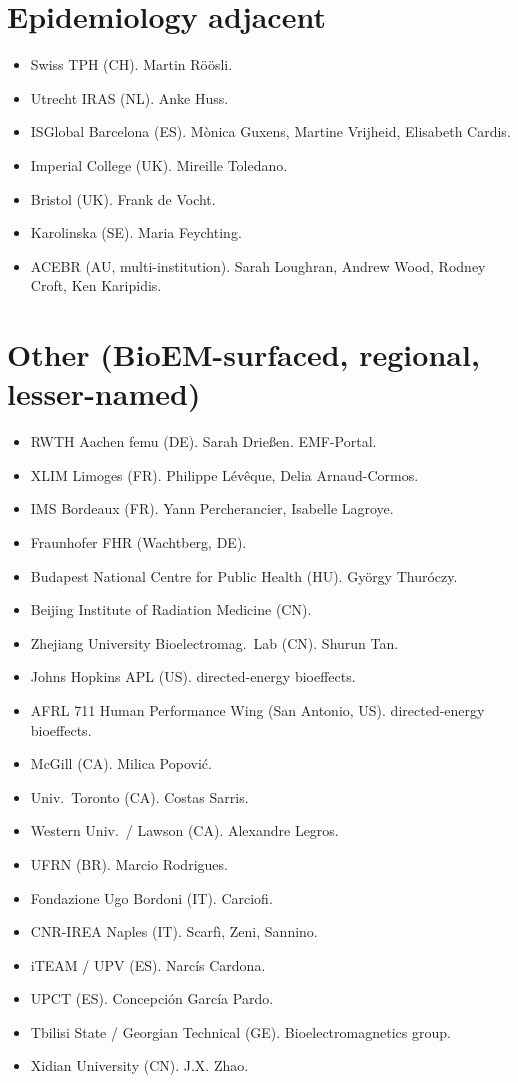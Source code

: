 \documentclass[10pt,a4paper]{article}
\begin{document}
\section{Epidemiology adjacent}
\begin{itemize}
  \item Swiss TPH (CH). Martin R\"o\"osli.
  \item Utrecht IRAS (NL). Anke Huss.
  \item ISGlobal Barcelona (ES). M\`onica Guxens, Martine Vrijheid, Elisabeth Cardis.
  \item Imperial College (UK). Mireille Toledano.
  \item Bristol (UK). Frank de Vocht.
  \item Karolinska (SE). Maria Feychting.
  \item ACEBR (AU, multi-institution). Sarah Loughran, Andrew Wood, Rodney Croft, Ken Karipidis.
\end{itemize}

\section{Other (BioEM-surfaced, regional, lesser-named)}
\begin{itemize}
  \item RWTH Aachen femu (DE). Sarah Drie\ss en. EMF-Portal.
  \item XLIM Limoges (FR). Philippe L\'ev\^eque, Delia Arnaud-Cormos.
  \item IMS Bordeaux (FR). Yann Percherancier, Isabelle Lagroye.
  \item Fraunhofer FHR (Wachtberg, DE).
  \item Budapest National Centre for Public Health (HU). Gy\"orgy Thur\'oczy.
  \item Beijing Institute of Radiation Medicine (CN).
  \item Zhejiang University Bioelectromag.\ Lab (CN). Shurun Tan.
  \item Johns Hopkins APL (US). directed-energy bioeffects.
  \item AFRL 711 Human Performance Wing (San Antonio, US). directed-energy bioeffects.
  \item McGill (CA). Milica Popovi\'c.
  \item Univ.\ Toronto (CA). Costas Sarris.
  \item Western Univ.\ / Lawson (CA). Alexandre Legros.
  \item UFRN (BR). Marcio Rodrigues.
  \item Fondazione Ugo Bordoni (IT). Carciofi.
  \item CNR-IREA Naples (IT). Scarf\`i, Zeni, Sannino.
  \item iTEAM / UPV (ES). Narc\'is Cardona.
  \item UPCT (ES). Concepci\'on Garc\'ia Pardo.
  \item Tbilisi State / Georgian Technical (GE). Bioelectromagnetics group.
  \item Xidian University (CN). J.X. Zhao.
\end{itemize}
\end{document}
